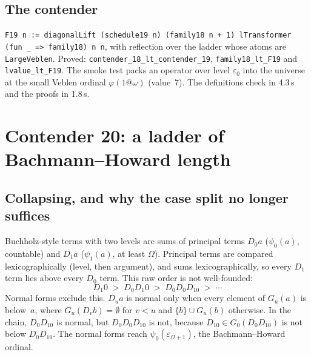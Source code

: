 \documentclass[11pt]{article}
\theoremstyle{definition}
\theoremstyle{remark}
\newcommand{\lean}[1]{\texttt{#1}}
\begin{document}
\subsection{The contender}
\lean{F19 n := diagonalLift (schedule19 n) (family18 n + 1) lTransformer (fun \_ => family18) n n},
with reflection over the ladder whose atoms are \lean{LargeVeblen}. Proved:
\lean{contender\_18\_lt\_\allowbreak contender\_19}, \lean{family18\_lt\_F19}
and \lean{lvalue\_lt\_F19}. The smoke test packs an operator over level
$\varepsilon_0$ into the universe at the small Veblen ordinal
$\varphi(1@\omega)$ (value~7). The definitions check in 4.3\,s and the proofs
in 1.8\,s.

\section{Contender 20: a ladder of Bachmann--Howard length}

\subsection{Collapsing, and why the case split no longer suffices}
Buchholz-style terms with two levels are sums of principal terms $D_0a$
($\psi_0(a)$, countable) and $D_1a$ ($\psi_1(a)$, at least $\Omega$). Principal
terms are compared lexicographically (level, then argument), and sums
lexicographically, so every $D_1$ term lies above every $D_0$ term. This raw
order is not well-founded:
\[D_1 0 \;>\; D_0D_1 0 \;>\; D_0D_0D_10 \;>\;\cdots\]
Normal forms exclude this. $D_u a$ is normal only when every element of
$G_u(a)$ is below~$a$, where $G_u(D_v b)=\emptyset$ for $v<u$ and
$\{b\}\cup G_u(b)$ otherwise. In the chain, $D_0D_10$ is normal, but
$D_0D_0D_10$ is not, because $D_10\in G_0(D_0D_10)$ is not below $D_0D_10$. The
normal forms reach $\psi_0(\varepsilon_{\Omega+1})$, the Bachmann--Howard
ordinal.
\end{document}
